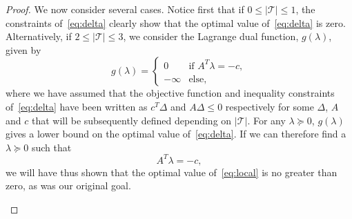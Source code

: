 \begin{proof}
We now consider several cases.  Notice first that if $0 \leq |\mathcal{T}| \leq 1$, the constraints of~\eqref{eq:delta} clearly show that the optimal value of~\eqref{eq:delta} is zero. Alternatively, if $2 \leq |\mathcal{T}| \leq 3$, we consider the Lagrange dual function, $g(\lambda)$, given by~\cite[Section~5.2.1]{boyd2004convex}
\begin{equation}
g(\lambda) = 
	\begin{cases}
   		0 & \text{if } A^T \lambda = -c, \\
   		-\infty & \text{else,}
	\end{cases}
\end{equation}  
where we have assumed that the objective function and inequality constraints of~\eqref{eq:delta} have been written as $c^T\Delta$ and $A\Delta \leq 0$ respectively for some $\Delta$, $A$ and $c$ that will be subsequently defined depending on $|\mathcal{T}|$.  For any $\lambda \succeq 0$, $g(\lambda)$ gives a lower bound on the optimal value of~\eqref{eq:delta}.  If we can therefore find a $\lambda \succeq 0$ such that 
\begin{equation}
\label{eq:lambda}
A^T \lambda = -c, 
\end{equation}
we will have thus shown that the optimal value of~\eqref{eq:local} is no greater than zero, as was our original goal.

\begin{enumerate}


\end{enumerate}
\end{proof}
